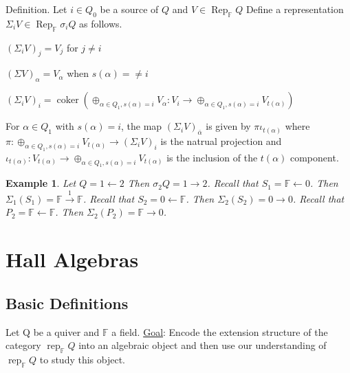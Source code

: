 \documentclass{book}
\newtheorem{example}{Example}[section]
\DeclareMathOperator{\Rep}{Rep}
\DeclareMathOperator{\rep}{rep}
\DeclareMathOperator{\coker}{coker}
\begin{document}
Definition. Let $i \in Q_0$ be a source of $Q$ and $V \in \Rep_{\mathbb F} Q$ Define a representation $\Sigma_i V \in \Rep_{\mathbb F} \sigma_i Q$ as follows.

$(\Sigma_i V)_j = V_j$ for $j \neq i$

$(\Sigma V)_\alpha = V_\alpha$ when $s(\alpha) =\neq i$

$(\Sigma_i V)_i = \coker(\oplus_{\alpha \in Q_1,s(\alpha) = i} V_\alpha: V_i \to \oplus_{\alpha \in Q_1, s(\alpha) = i} V_{t(\alpha)})$

For $\alpha \in Q_1$ with $s(\alpha) = i$, the map $(\Sigma_i V)_{\bar \alpha}$ is given by $\pi \iota_{t(\alpha)}$ where $\pi: \oplus_{\alpha \in Q_1, s(\alpha) = i} V_{t(\alpha)} \to (\Sigma_i V)_i$ is the natrual projection and $\iota_{t(\alpha)}: V_{t(\alpha)} \to \oplus_{\alpha \in Q_1,s(\alpha) = i} V_{t(\alpha)}$ is the inclusion of the $t(\alpha)$ component.

\begin{example}
Let $Q = 1 \leftarrow 2$ Then $\sigma_2 Q = 1 \to 2$. Recall that $S_1 = \mathbb F \leftarrow 0$. Then $\Sigma_1(S_1) = \mathbb F \overset 1 \to \mathbb F$. Recall that $S_2 = 0 \leftarrow \mathbb F$. Then $\Sigma_2(S_2) = 0 \to 0$. Recall that $P_2 = \mathbb F \leftarrow \mathbb F$. Then $\Sigma_2(P_2) = \mathbb F \to 0$.
\end{example} 

\chapter{Hall Algebras}

  \section{Basic Definitions}
  
      	Let Q be a quiver and $\mathbb{F}$ a field.
 	\underline{Goal}: Encode the extension structure of the category $\rep_\mathbb{F}Q$ into an algebraic object and then use our understanding of $\rep_\mathbb{F}Q$ to study this object.
    
\end{document}
